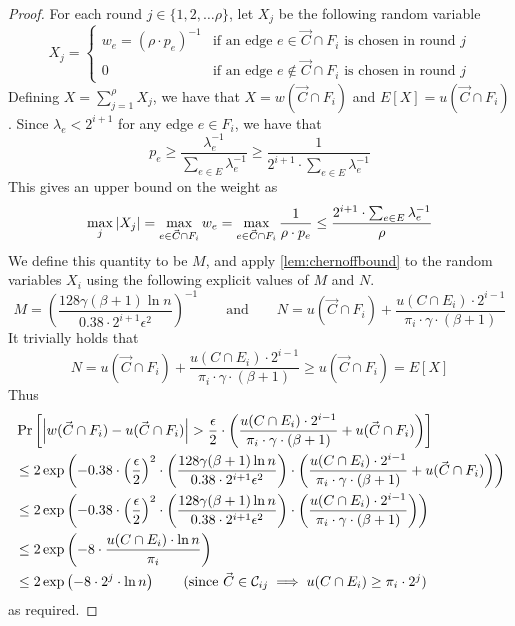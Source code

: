 \documentclass[11pt,a4paper]{article}
\newcommand{\abs}[1]{\ensuremath{\left| #1 \right|}}
\newcommand{\eps}{\epsilon}
\begin{document}
\singlecutconc*
\begin{proof}
For each round $j \in \{ 1,2, \ldots \rho\}$, let $X_j$ be the following random variable
\[
X_j =
\begin{cases}
    w_e = (\rho \cdot p_e)^{-1} & \text{if an edge $e \in \vec{C} \cap F_i$ is chosen in round $j$} \\
    0 & \text{if an edge $e \not\in \vec{C} \cap F_i$ is chosen in round $j$}
\end{cases}
\]
Defining $X = \sum_{j=1}^\rho X_j$, we have that $X = w(\vec{C} \cap F_i)$ and $E[X] = u(\vec{C} \cap F_i)$.
Since $\lambda_e < 2^{i+1}$ for any edge $e \in F_i$, we have that
\[
p_e
\ge \frac{\lambda_e^{-1}}{\sum_{e \in E} \lambda_e^{-1}}
\ge \frac{1}{2^{i+1} \cdot \sum_{e \in E} \lambda_e^{-1}}
\]
This gives an upper bound on the weight as
\[
\max_j |X_j|
= \max_{e \in \vec{C} \cap F_i} w_e \\
= \max_{e \in \vec{C} \cap F_i} \frac{1}{\rho \cdot p_e}
\le \frac{2^{i+1} \cdot \sum_{e \in E} \lambda_e^{-1}}{\rho}
\]
We define this quantity to be $M$, and apply \cref{lem:chernoffbound} to the random variables $X_i$ using the following explicit values of $M$ and $N$.
\[
M = \left( \frac{128 \gamma (\beta+1) \ln n}{0.38 \cdot 2^{i+1} \eps^2} \right)^{-1}
\qquad \text{and} \qquad
N = u(\vec{C} \cap F_i) + \frac{u(C \cap E_i) \cdot 2^{i-1}}{\pi_i \cdot \gamma \cdot (\beta+1)}
\]
It trivially holds that
\[
N = u(\vec{C} \cap F_i) + \frac{u(C \cap E_i) \cdot 2^{i-1}}{\pi_i \cdot \gamma \cdot (\beta+1)}
\ge u(\vec{C} \cap F_i) = E[X]
\]
Thus
\begin{align*}
&\Pr \left[ \abs{w(\vec{C} \cap F_i) - u(\vec{C} \cap F_i)} > \frac{\eps}{2} \cdot \left( \frac{u(C \cap E_i) \cdot 2^{i-1}}{\pi_i \cdot \gamma \cdot (\beta+1)} + u(\vec{C} \cap F_i) \right) \right] \\
&\le 2 \exp\left(- 0.38 \cdot \left(\frac{\eps}{2}\right)^2 \cdot
\left( \frac{128 \gamma (\beta+1) \ln n}{0.38 \cdot 2^{i+1} \eps^2} \right) \cdot \left( \frac{u(C \cap E_i) \cdot 2^{i-1}}{\pi_i \cdot \gamma \cdot (\beta+1)} + u(\vec{C} \cap F_i) \right)
\right) \\
&\le 2 \exp\left(- 0.38 \cdot \left(\frac{\eps}{2}\right)^2 \cdot
\left( \frac{128 \gamma (\beta+1) \ln n}{0.38 \cdot 2^{i+1} \eps^2} \right) \cdot \left( \frac{u(C \cap E_i) \cdot 2^{i-1}}{\pi_i \cdot \gamma \cdot (\beta+1)}\right)
\right) \\
&\le 2 \exp\left( -8 \cdot \frac{u(C \cap E_i) \cdot \ln n}{\pi_i} \right) \\
&\le 2 \exp\left( -8 \cdot 2^j \cdot \ln n \right) \tag*{(since $\vec{C} \in \mathcal C_{ij} \implies u(C \cap E_i) \ge \pi_i \cdot 2^j$)}
\end{align*}
as required.
\end{proof}
\end{document}
